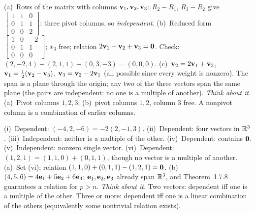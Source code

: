\documentclass[11pt]{article}
\begin{document}
\begin{sol}
(a)~Rows of the matrix with columns $\mathbf{v}_1,\mathbf{v}_2,\mathbf{v}_3$: $R_2-R_1$, $R_3-R_2$ give $\begin{bmatrix}1&1&0\\0&1&1\\0&0&2\end{bmatrix}$: three pivot columns, so \emph{independent}.
(b)~Reduced form $\begin{bmatrix}1&0&-2\\0&1&1\\0&0&0\end{bmatrix}$; $x_3$ free; relation $2\mathbf{v}_1-\mathbf{v}_2+\mathbf{v}_3=\mathbf{0}$. Check: $(2,-2,4)-(2,1,1)+(0,3,-3)=(0,0,0)$.
(c)~$\mathbf{v}_2=2\mathbf{v}_1+\mathbf{v}_3$, $\mathbf{v}_1=\tfrac12(\mathbf{v}_2-\mathbf{v}_3)$, $\mathbf{v}_3=\mathbf{v}_2-2\mathbf{v}_1$ (all possible since every weight is nonzero). The span is a plane through the origin; any two of the three vectors span the same plane (the pairs are independent: no one is a multiple of another).
\emph{Think about it.} (a)~Pivot columns $1,2,3$; (b)~pivot columns $1,2$, column $3$ free. A nonpivot column is a combination of earlier columns.
\end{sol}

\begin{sol}
(i)~Dependent: $(-4,2,-6)=-2(2,-1,3)$. (ii)~Dependent: four vectors in $\mathbb{R}^3$. (iii)~Independent: neither is a multiple of the other. (iv)~Dependent: contains $\mathbf{0}$. (v)~Independent: nonzero single vector. (vi)~Dependent: $(1,2,1)=(1,1,0)+(0,1,1)$, though no vector is a multiple of another.
(a)~Set (vi); relation $(1,1,0)+(0,1,1)-(1,2,1)=\mathbf{0}$. (b)~$(4,5,6)=4\mathbf{e}_1+5\mathbf{e}_2+6\mathbf{e}_3$; $\mathbf{e}_1,\mathbf{e}_2,\mathbf{e}_3$ already span $\mathbb{R}^3$, and Theorem~1.7.8 guarantees a relation for $p>n$.
\emph{Think about it.} Two vectors: dependent iff one is a multiple of the other. Three or more: dependent iff one is a linear combination of the others (equivalently some nontrivial relation exists).
\end{sol}
\end{document}

